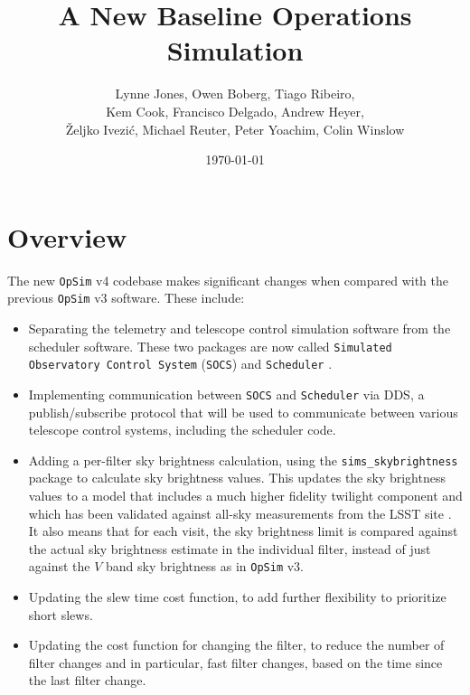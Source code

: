 \documentclass[DM,authoryear,toc]{lsstdoc}
\title{A New Baseline Operations Simulation}
\author{%
Lynne Jones,
Owen Boberg,
Tiago Ribeiro, \\
Kem Cook,
Francisco Delgado,
Andrew Heyer, \\
\v{Z}eljko Ivezi\'{c},
Michael Reuter,
Peter Yoachim,
Colin Winslow
}
\date{\today}
\newcommand{\opsim}{\texttt{OpSim}\xspace}
\newcommand{\socs}{\texttt{SOCS}\xspace}
\newcommand{\sched}{\texttt{Scheduler}\xspace}
\newcommand{\simsky}{\texttt{sims\_skybrightness}\xspace}
\begin{document}
\maketitle

\section{Overview}

The new \opsim v4 codebase makes significant changes when compared with the previous \opsim v3 software. These include:
\begin{itemize}
\item Separating the telemetry and telescope control simulation software from the scheduler software. These two packages are now called \texttt{Simulated Observatory Control System} (\socs) \citep{2016SPIE.9911E..25R} and \texttt{Scheduler} \citep{2016SPIE.9910E..13D}.
\item Implementing communication between \socs and \sched via DDS, a publish/subscribe protocol that will be used to communicate between various telescope control systems, including the scheduler code.
\item Adding a per-filter sky brightness calculation, using the \simsky package to calculate sky brightness values. This updates the sky brightness values to a model that includes a much higher fidelity twilight component and which has been validated against all-sky measurements from the LSST site \citep{2016SPIE.9910E..1AY}. It also means that for each visit, the sky brightness limit is compared against the actual sky brightness estimate in the individual filter, instead of just against the $V$ band sky brightness as in \opsim v3.
\item Updating the slew time cost function, to add further flexibility to prioritize short slews.
\item Updating the cost function for changing the filter, to reduce the number of filter changes and in particular, fast filter changes, based on the time since the last filter change.

\end{itemize}
\end{document}
